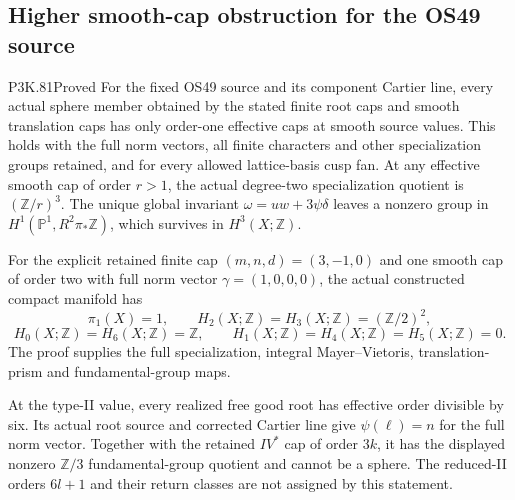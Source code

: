 \subsection{Higher smooth-cap obstruction for the OS49 source}
\begin{statement}{P3K.81}{Proved}
For the fixed OS49 source and its component Cartier line, every
actual sphere member obtained by the stated finite root caps and smooth
translation caps has only order-one effective caps at smooth source values.
This holds with the full norm vectors, all finite characters and other
specialization groups retained, and for every allowed lattice-basis cusp
fan. At any effective smooth cap of order \(r>1\), the actual degree-two
specialization quotient is \((\mathbb Z/r)^3\). The unique global invariant
\(\omega=uw+3\psi\delta\) leaves a nonzero group in
\(H^1(\mathbb P^1,R^2\pi_*\mathbb Z)\), which survives in \(H^3(X;\mathbb Z)\).

For the explicit retained finite cap \((m,n,d)=(3,-1,0)\) and one smooth
cap of order two with full norm vector \(\gamma=(1,0,0,0)\), the actual
constructed compact manifold has
\[
 \pi_1(X)=1,\qquad H_2(X;\mathbb Z)=H_3(X;\mathbb Z)=(\mathbb Z/2)^2,
\]
\[
 H_0(X;\mathbb Z)=H_6(X;\mathbb Z)=\mathbb Z,
 \qquad H_1(X;\mathbb Z)=H_4(X;\mathbb Z)=H_5(X;\mathbb Z)=0.
\]
The proof supplies the full specialization, integral Mayer--Vietoris,
translation-prism and fundamental-group maps.

At the type-II value, every realized free good root has effective order
divisible by six. Its actual root source and corrected Cartier line give
\(\psi(\ell)=n\) for the full norm vector. Together with the retained
\(IV^*\) cap of order \(3k\), it has the displayed nonzero
\(\mathbb Z/3\) fundamental-group quotient and cannot be a sphere.
The reduced-II orders \(6l+1\) and their return classes are not assigned
by this statement.
\end{statement}
